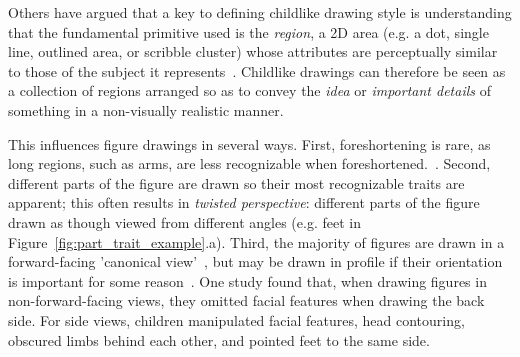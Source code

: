 
Others have argued that a key to defining childlike drawing style is understanding that the fundamental primitive used is the \textit{region}, a 2D area (e.g. a dot, single line, outlined area, or scribble cluster) whose attributes are perceptually similar to those of the subject it represents~\cite{willats2006making}. Childlike drawings can therefore be seen as a collection of regions arranged so as to convey the \textit{idea} or \textit{important details} of something in a non-visually realistic manner. 

This influences figure drawings in several ways.
First, foreshortening is rare, as long regions, such as arms, are less recognizable when foreshortened.~\cite{willats1992representation,piaget1956}.
Second, different parts of the figure are drawn so their most recognizable traits are apparent; this often results in \textit{twisted perspective}: different parts of the figure drawn as though viewed from different angles (e.g. feet in Figure~\ref{fig:part_trait_example}.a). 
Third, the majority of figures are drawn in a forward-facing 'canonical view'~\cite{goodnow1977children,cox2014drawings}, but may be drawn in profile if their orientation is important for some reason~\cite{cox1993children}.
One study found that, when drawing figures in non-forward-facing views, they omitted facial features when drawing the back side. For side views, children manipulated facial features, head contouring, obscured limbs behind each other, and pointed feet to the same side.



